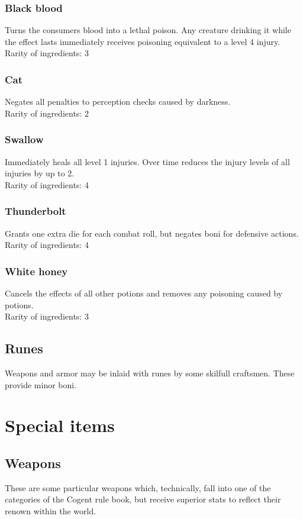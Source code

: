\documentclass[parskip=full,11pt,%
footheight=38pt]{scrreport}
\begin{document}
\subsection{Black blood}
Turns the consumers blood into a lethal poison. Any creature drinking it while the effect lasts immediately receives
poisoning equivalent to a level 4 injury.
\\[2ex]
Rarity of ingredients: 3

\subsection{Cat}
Negates all penalties to perception checks caused by darkness.
\\[2ex]
Rarity of ingredients: 2

\subsection{Swallow}
Immediately heals all level 1 injuries. Over time reduces the injury levels of all injuries by up to 2.
\\[2ex]
Rarity of ingredients: 4

\subsection{Thunderbolt}
Grants one extra die for each combat roll, but negates boni for defensive actions.
\\[2ex]
Rarity of ingredients: 4

\subsection{White honey}
Cancels the effects of all other potions and removes any poisoning caused by potions.
\\[2ex]
Rarity of ingredients: 3

\section{Runes}
Weapons and armor may be inlaid with runes by some skilfull craftsmen. These provide minor boni.

\chapter{Special items}
\section{Weapons}
These are some particular weapons which, technically, fall into one of the categories of the Cogent rule book,
but receive superior stats to reflect their renown within the world.
\end{document}
